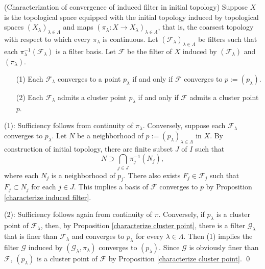 \documentclass{report}
\begin{document}
\begin{thm}\label{characterize convergence of induced filter} (Characterization of convergence of induced filter in initial topology)
    Suppose \( X \) is the topological space equipped with the initial topology induced by topological spaces \( (X_{\lambda})_{\lambda \in \Lambda} \) and maps \( (\pi_{\lambda}:X \to X_{\lambda})_{\lambda \in \Lambda} \), that is, the coarsest topology with respect to which every \( \pi_{\lambda} \) is continuous.
    Let \( (\mathscr{F}_{\lambda})_{\lambda \in \Lambda} \) be filters such that each \( \pi_{\lambda}^{-1}(\mathscr{F}_{\lambda}) \) is a filter basis.
    Let \( \mathscr{F} \) be the filter of \( X \) induced by \( (\mathscr{F}_{\lambda}) \) and \( (\pi_{\lambda}) \).
    \begin{itemize}
        \item[(1)] Each \( \mathscr{F}_{\lambda} \) converges to a point \( p_{\lambda}\) if and only if \( \mathscr{F} \) converges to \( p:=(p_{\lambda}) \).

        \item[(2)] Each \( \mathscr{F}_{\lambda} \) admits a cluster point \( p_{\lambda} \) if and only if \( \mathscr{F} \) admits a cluster point \( p \).
    \end{itemize}
\end{thm}
\begin{prf}
    (1): Sufficiency follows from continuity of \( \pi_{\lambda} \). Conversely, suppose each \( \mathscr{F}_{\lambda} \) converges to \( p_{\lambda} \).
    Let \( N \) be a neighborhood of \( p:=(p_{\lambda})_{\lambda \in \Lambda} \) in \( X \). By construction of initial topology, there are finite subset \( J \) of \( I \) such that
    \begin{equation*}
        N \supset \bigcap_{j \in J} \pi_{j}^{-1}(N_{j}),
    \end{equation*}
    where each \( N_j \) is a neighborhood of \( p_j \). There also exists \( F_j \in \mathscr{F}_j \) such that \( F_j \subset N_j \) for each \( j \in J \).
    This implies a basis of \( \mathscr{F} \) converges to \( p \) by Proposition \ref{characterize induced filter}.

    (2): Sufficiency follows again from continuity of \( \pi \). Conversely, if \( p_{\lambda} \) is a cluster point of \( \mathscr{F}_{\lambda} \), then, by Proposition \ref{characterize cluster point}, there is a filter \( \mathscr{G}_{\lambda} \) that is finer than \( \mathscr{F}_{\lambda} \) and converges to \( p_{\lambda} \) for every \( \lambda \in \Lambda \). Then (1) implies the filter \( \mathscr{G} \) induced by \( (\mathscr{G}_{\lambda}, \pi_{\lambda}) \) converges to \( (p_{\lambda}) \). Since \( \mathscr{G} \) is obviously finer than \( \mathscr{F} \), \( (p_{\lambda}) \) is a cluster point of \( \mathscr{F} \) by Proposition \ref{characterize cluster point}.
    \qed\end{prf}
\end{document}
